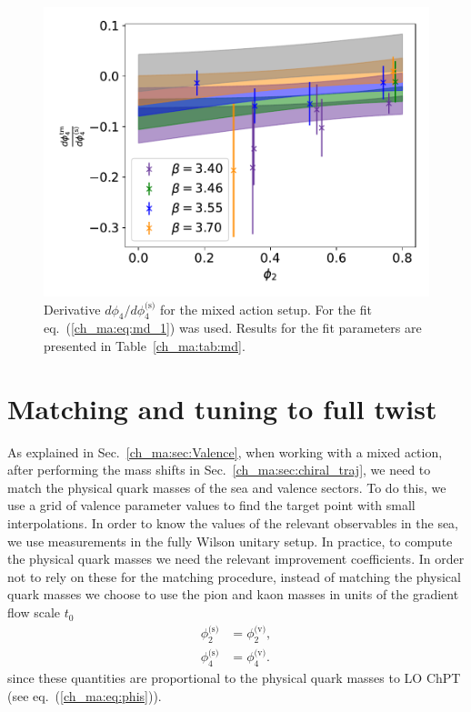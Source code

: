 \begin{figure}
    \centering
    \includegraphics[width=1.\textwidth]{./cap4/figs/dphi4_tm.pdf}
    \caption{Derivative $d\phi_4/d\phi_4^{\textrm{(s)}}$ for the mixed action setup. For the fit eq.~(\ref{ch_ma:eq:md_1}) was used. Results for the fit parameters are presented in Table~\ref{ch_ma:tab:md}.}
    \label{ch_ma:fig:dphi4_tm}
\end{figure}



\section{Matching and tuning to full twist}
\label{ch_ma:sec:matching}

As explained in Sec.~\ref{ch_ma:sec:Valence}, when working with a mixed action, after performing the mass shifts in Sec.~\ref{ch_ma:sec:chiral_traj}, we need to match the physical quark masses of the sea and valence sectors. To do this, we use a grid of valence parameter values to find the target point with small interpolations. In order to know the values of the relevant observables in the sea, we use measurements in the fully Wilson unitary setup.
In practice, to compute the physical quark masses we need the relevant improvement coefficients. In order not to rely on these for the matching procedure, instead of matching the physical quark masses we choose to use the pion and kaon masses in units of the gradient flow scale $t_0$
\begin{align}
\label{ch_ma:eq:matching}
\phi_2^{\textrm{(s)}}&=\phi_2^{\textrm{(v)}},\\
\phi_4^{\textrm{(s)}}&=\phi_4^{\textrm{(v)}}.
\end{align}
since these quantities are proportional to the physical quark masses to LO ChPT (see eq.~(\ref{ch_ma:eq:phis})).

